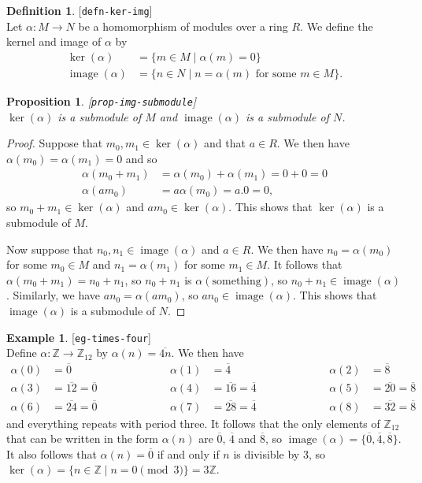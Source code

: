 \documentclass{amsart}
\newcommand{\lbl}[1]{\label{#1}\textup{[\texttt{#1}]}\ \\}
\newcommand{\lbl}{\label}
\newcommand{\img}       {\operatorname{image}}
\newcommand{\Z}         {{\mathbb{Z}}}
\newcommand{\al}        {\alpha}
\newcommand{\ov}[1]     {\overline{#1}}
\newcommand{\xra}       {\xrightarrow}
\newcommand{\st}        {\;|\;}
\renewcommand{\:}{\colon}
\newtheorem{proposition}[theorem]{Proposition}
\theoremstyle{definition}
\newtheorem{definition}[theorem]{Definition}
\newtheorem{example}[theorem]{Example}
\begin{document}
\begin{definition}\lbl{defn-ker-img}
 Let $\al\:M\xra{}N$ be a homomorphism of modules over a ring $R$.  We
 define the kernel and image of $\al$ by 
 \begin{align*}
  \ker(\al) &= \{ m\in M \st \al(m) = 0 \} \\
  \img(\al) &= \{ n\in N \st n=\al(m) \text{ for some } m\in M\}.
 \end{align*}
\end{definition}
\begin{proposition}\lbl{prop-img-submodule}
 $\ker(\al)$ is a submodule of $M$ and $\img(\al)$ is a submodule of
 $N$. 
\end{proposition}
\begin{proof}
 Suppose that $m_0,m_1\in\ker(\al)$ and that $a\in R$.  We then have
 $\al(m_0)=\al(m_1)=0$ and so
 \begin{align*}
  \al(m_0+m_1) &= \al(m_0) + \al(m_1) = 0+0 = 0 \\
  \al(am_0) &= a\al(m_0) = a.0 = 0,
 \end{align*}
 so $m_0+m_1\in\ker(\al)$ and $am_0\in\ker(\al)$.  This shows that
 $\ker(\al)$ is a submodule of $M$.

 Now suppose that $n_0,n_1\in\img(\al)$ and $a\in R$.  We then have
 $n_0=\al(m_0)$ for some $m_0\in M$ and $n_1=\al(m_1)$ for some
 $m_1\in M$.  It follows that $\al(m_0+m_1)=n_0+n_1$, so $n_0+n_1$ is
 $\al(\text{something})$, so $n_0+n_1\in\img(\al)$.  Similarly, we
 have $an_0=\al(am_0)$, so $an_0\in\img(\al)$.  This shows that
 $\img(\al)$ is a submodule of $N$.
\end{proof}
\begin{example}\lbl{eg-times-four}
 Define $\al\:\Z\xra{}\Z_{12}$ by $\al(n)=\ov{4n}$.  We then have 
 \[ \begin{array}{rlcrlcrl}
  \al(0) &= \ov{0} & \hspace{5em} &
  \al(1) &= \ov{4} & \hspace{5em} &
  \al(2) &= \ov{8} \\
  \al(3) &= \ov{12} = \ov{0} & \hspace{5em} &
  \al(4) &= \ov{16} = \ov{4} & \hspace{5em} &
  \al(5) &= \ov{20} = \ov{8} \\
  \al(6) &= \ov{24} = \ov{0} & \hspace{5em} &
  \al(7) &= \ov{28} = \ov{4} & \hspace{5em} &
  \al(8) &= \ov{32} = \ov{8}
 \end{array} \]
 and everything repeats with period three.  It follows that the only
 elements of $\Z_{12}$ that can be written in the form $\al(n)$ are
 $\ov{0}$, $\ov{4}$ and $\ov{8}$, so
 $\img(\al)=\{\ov{0},\ov{4},\ov{8}\}$.  It also follows that
 $\al(n)=\ov{0}$ if and only if $n$ is divisible by $3$, so
 $\ker(\al)=\{n\in\Z\st n=0\pmod{3}\}=3\Z$. 
\end{example}
\end{document}
